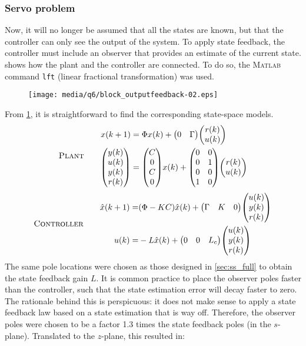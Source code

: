 \subsubsection{Servo problem}
Now, it will no longer be assumed that all the states are known, but that the controller can only see the output of the system. To apply state feedback, the controller must include an observer that provides an estimate of the current state.  shows how the plant and the controller are connected. To do so, the \textsc{Matlab} command \texttt{lft} (linear fractional transformation) was used.
\begin{figure}[ht]
    \centering
    \texttt{[image: media/q6/block\_outputfeedback-02.eps]}
    \caption{}
    \label{fig:q6_block_servo}
\end{figure}
From \cref{fig:q6_block_servo}, it is straightforward to find the corresponding state-space models.
\begin{equation}
    \text{\textsc{Plant}}\qquad
    \begin{aligned}
        x(k+1) &= \Phi x(k) + \mqty(0&\Gamma)\mqty(r(k)\\u(k))\\
        \mqty(y(k)\\u(k)\\y(k)\\r(k)) &= \mqty(C\\0\\C\\0)x(k) + \mqty(0&0\\0&1\\0&0\\1&0) \mqty(r(k)\\u(k))
    \end{aligned}
\end{equation}
\phantom{x}
\begin{equation}
    \text{\textsc{Controller}}\qquad
    \begin{aligned}
        \hat{x}(k+1) =& (\Phi - KC)\hat{x}(k) + \mqty(\Gamma&K&0)\mqty(u(k)\\y(k)\\r(k))\\
        u(k) =& -L\hat{x}(k) + \mqty(0&0&L_c)\mqty(u(k)\\y(k)\\r(k))
    \end{aligned}
\end{equation}
The same pole locations were chosen as those designed in \cref{sec:ss_full} to obtain the state feedback gain $L$. It is common practice to place the observer poles faster than the controller, such that the state estimation error will decay faster to zero. The rationale behind this is perspicuous: it does not make sense to apply a state feedback law based on a state estimation that is way off. Therefore, the observer poles were chosen to be a factor 1.3 times the state feedback poles (in the $s$-plane). Translated to the $z$-plane, this resulted in:
